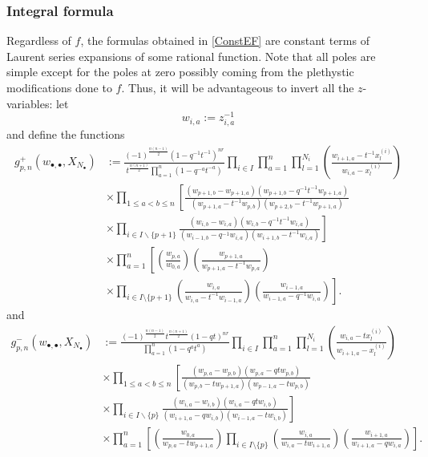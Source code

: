 \documentclass{amsart}
\theoremstyle{remark}
\numberwithin{thm}{section}
\numberwithin{equation}{section}
\begin{document}

\subsubsection{Integral formula}
Regardless of $f$, the formulas obtained in \ref{ConstEF} are constant terms of Laurent series expansions of some rational function.
Note that all poles are simple except for the poles at zero possibly coming from the plethystic modifications done to $f$.
Thus, it will be advantageous to invert all the $z$-variables: let
\[
w_{i,a}:=z_{i,a}^{-1}
\]
and define the functions
\begin{align}
\label{En1}
g_{p,n}^+(w_{\bullet,\bullet},X_{N_\bullet})
&:=\frac{(-1)^{\frac{n(n-1)}{2}}(1-q^{-1}t^{-1})^{nr}}{t^{\frac{n(n+1)}{2}}\prod_{a=1}^n(1-q^{-a}t^{-a})}
\prod_{i\in I}\prod_{a=1}^n\prod_{l=1}^{N_i}\left(\frac{ w_{i+1,a}-t^{-1}x_{l}^{(i)} }{ w_{i,a}-x_{l}^{(i)} }\right)\\
\label{En2}
&\times\prod_{1\le a<b\le n}
\left[
\frac{\left(w_{p+1,b}-w_{p+1,a}\right)\left(w_{p+1,b}-q^{-1}t^{-1}w_{p+1,a}\right)}
{\left(w_{p+1,a}-t^{-1}w_{p,b}\right)\left(w_{p+2,b}-t^{-1}w_{p+1,a}\right)}\right.\\
\label{En3}
&\times\left.
\prod_{i\in I\backslash\{p+1\}}
\frac{\left(w_{i,b}-w_{i,a}\right)\left(w_{i,b}-q^{-1}t^{-1}w_{i,a}\right)}{\left(w_{i-1,b}-q^{-1}w_{i,a}\right)\left(w_{i+1,b}-t^{-1}w_{i,a}\right)}\right]\\
\label{En4}
&\times\prod_{a=1}^n \left[
\left(\frac{w_{p,a}}{w_{0,a}}\right)\left(\frac{w_{p+1,a}}{w_{p+1,a}-t^{-1}w_{p,a}}\right)\right.\\
\label{En5}
&\times\left.
\prod_{i\in I\setminus\{p+1\}}
\left(\frac{w_{i,a}}{w_{i,a}-t^{-1}w_{i-1,a}}\right)
\left( \frac{w_{i-1,a}}{w_{i-1,a}-q^{-1}w_{i,a}} \right)\right].
\end{align}
and
\begin{align}
g_{p,n}^-(w_{\bullet,\bullet},X_{N_\bullet})
&:=
\label{Fn1}
\frac{(-1)^{\frac{n(n-1)}{2}}t^{\frac{n(n+1)}{2}}(1-qt)^{nr}}{\prod_{a=1}^n(1-q^at^a)} 
\prod_{i\in I}\prod_{a=1}^n\prod_{l=1}^{N_i}\left(\frac{  w_{i,a}-tx_{l}^{(i)} }{ w_{i+1,a}-x_{l}^{(i)} }\right)\\
\label{Fn2}
&\times\prod_{1\le a<b\le n}\left[
\frac{\left(w_{p,a}-w_{p,b}\right)\left(w_{p,a}-qtw_{p,b}\right)}{\left(w_{p,b}-tw_{p+1,a}\right)\left(w_{p-1,a}-tw_{p,b}\right)}\right.\\
\label{Fn3}
&\times\left.
\prod_{i\in I\backslash\{p\}}
\frac{\left(w_{i,a}-w_{i,b}\right)\left(w_{i,a}-qtw_{i,b}\right)}{\left(w_{i+1,a}-qw_{i,b}\right)\left(w_{i-1,a}-tw_{i,b}\right)}\right]\\
\label{Fn4}
&\times
\prod_{a=1}^n\left[
\left(\frac{w_{0,a}}{w_{p,a}-tw_{p+1,a}}\right)
\prod_{i\in I\setminus\{p\}}
\left(\frac{w_{i,a}}{w_{i,a}-tw_{i+1,a}}\right)
\left( \frac{w_{i+1,a}}{w_{i+1,a}-qw_{i,a}} \right)
\right].
\end{align}
\end{document}
